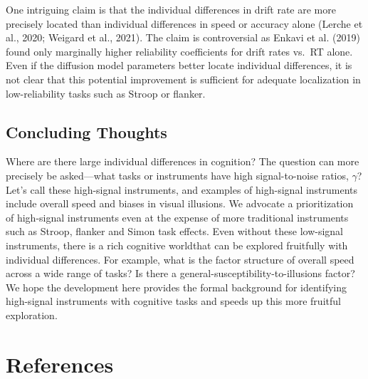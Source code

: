 \documentclass[
  ,man]{apa6}
\begin{document}
One intriguing claim is that the individual differences in drift rate are more precisely located than individual differences in speed or accuracy alone (Lerche et al., 2020; Weigard et al., 2021). The claim is controversial as Enkavi et al. (2019) found only marginally higher reliability coefficients for drift rates vs.~RT alone. Even if the diffusion model parameters better locate individual differences, it is not clear that this potential improvement is sufficient for adequate localization in low-reliability tasks such as Stroop or flanker.

\hypertarget{concluding-thoughts}{%
\subsection{Concluding Thoughts}\label{concluding-thoughts}}

Where are there large individual differences in cognition? The question can more precisely be asked---what tasks or instruments have high signal-to-noise ratios, \(\gamma\)? Let's call these high-signal instruments, and examples of high-signal instruments include overall speed and biases in visual illusions. We advocate a prioritization of high-signal instruments even at the expense of more traditional instruments such as Stroop, flanker and Simon task effects. Even without these low-signal instruments, there is a rich cognitive worldthat can be explored fruitfully with individual differences. For example, what is the factor structure of overall speed across a wide range of tasks? Is there a general-susceptibility-to-illusions factor? We hope the development here provides the formal background for identifying high-signal instruments with cognitive tasks and speeds up this more fruitful exploration.

\newpage

\hypertarget{references}{%
\section*{References}\label{references}}
\end{document}
